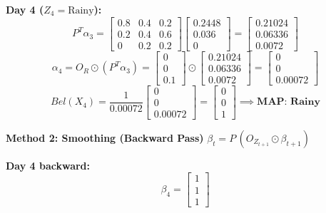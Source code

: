 \documentclass{article}
\begin{document}
\begin{enumerate}
    \textbf{Day 4 ($Z_4 = \text{Rainy}$):}
    $$ P^T \alpha_3 = \begin{bmatrix} 0.8 & 0.4 & 0.2 \\ 0.2 & 0.4 & 0.6 \\ 0 & 0.2 & 0.2 \end{bmatrix} \begin{bmatrix} 0.2448 \\ 0.036 \\ 0 \end{bmatrix} = \begin{bmatrix} 0.21024 \\ 0.06336 \\ 0.0072 \end{bmatrix} $$
    $$ \alpha_4 = O_R \odot (P^T \alpha_3) = \begin{bmatrix} 0 \\ 0 \\ 0.1 \end{bmatrix} \odot \begin{bmatrix} 0.21024 \\ 0.06336 \\ 0.0072 \end{bmatrix} = \begin{bmatrix} 0 \\ 0 \\ 0.00072 \end{bmatrix} $$
    $$ Bel(X_4) = \frac{1}{0.00072} \begin{bmatrix} 0 \\ 0 \\ 0.00072 \end{bmatrix} = \begin{bmatrix} 0 \\ 0 \\ 1 \end{bmatrix} \implies \textbf{MAP: Rainy} $$

    \vspace{1em}
    \textbf{Method 2: Smoothing (Backward Pass)} \quad $\beta_t = P\,(O_{Z_{t+1}} \odot \beta_{t+1})$

    \textbf{Day 4 backward:}
    $$ \beta_4 = \begin{bmatrix} 1 \\ 1 \\ 1 \end{bmatrix} $$


\end{enumerate}
\end{document}
